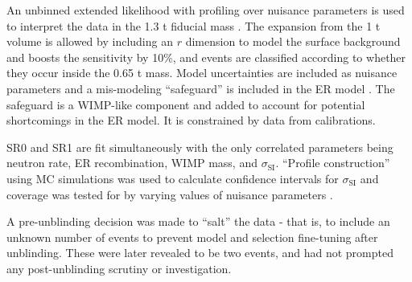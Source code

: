 An unbinned extended likelihood with profiling over nuisance parameters is used to interpret the data in the 1.3 t fiducial mass
.  The expansion from the 1 t volume is allowed by including an $r$ dimension to model the surface
background and boosts the sensitivity by 10\%, and events are classified according to whether they occur inside the 0.65 t
mass.  Model uncertainties are included as nuisance parameters and a mis-modeling ``safeguard'' is included in the ER model
.  The
safeguard is a WIMP-like component and added to account for potential shortcomings in the ER model.  It is constrained by data from
 calibrations.

SR0 and SR1 are fit simultaneously with the only correlated parameters being neutron rate, ER recombination, WIMP mass, and
$\sigma_{\mathrm{SI}}$.  ``Profile construction'' using MC simulations was used to calculate confidence intervals for
$\sigma_{\mathrm{SI}}$ and coverage was tested for by varying values of nuisance parameters .

A pre-unblinding decision was made to ``salt'' the data - that is, to include an unknown number of events to prevent model and
selection fine-tuning after unblinding.  These were later revealed to be two \ambe events, and had not prompted any post-unblinding
scrutiny or investigation.

